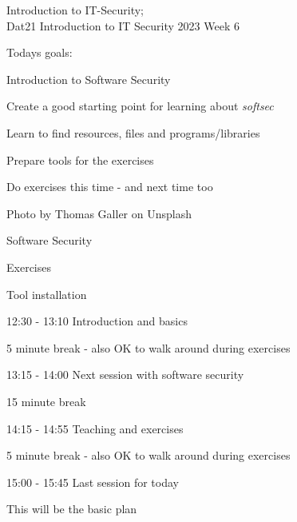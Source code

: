 \documentclass[Screen16to9,17pt]{foils}
\begin{document}
{Introduction to IT-Security;\\Dat21 Introduction to IT Security 2023 Week 6}

\hlkprofiluk



Todays goals:
\begin{list2}
\item Introduction to Software Security
\item Create a good starting point for learning about \emph{softsec}
\item Learn to find resources, files and programs/libraries
\item Prepare tools for the exercises
\item Do exercises this time - and next time too
\end{list2}

  Photo by Thomas Galler on Unsplash


\begin{list2}
\item Software Security
\end{list2}

Exercises
\begin{list2}
\item Tool installation
\end{list2}




\begin{list1}
\item 12:30 - 13:10 Introduction and basics
\item 5 minute break - also OK to walk around during exercises
\item 13:15 - 14:00 Next session with software security
\item 15 minute break
\item 14:15 - 14:55 Teaching and exercises
\item 5 minute break - also OK to walk around during exercises
\item 15:00 - 15:45 Last session for today
\end{list1}

\vskip 1cm
This will be the basic plan
\end{document}
